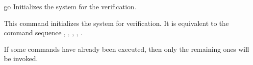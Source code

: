 \begin{nusmvCommand} {go} {Initializes the system for the verification.}


This command initializes the system for verification. It is equivalent
to the command sequence ,
, , \linebreak
{}, . 

If some commands have already been executed, then only the remaining
ones will be invoked.

\begin{cmdOpt}
\end{cmdOpt}

\end{nusmvCommand}
